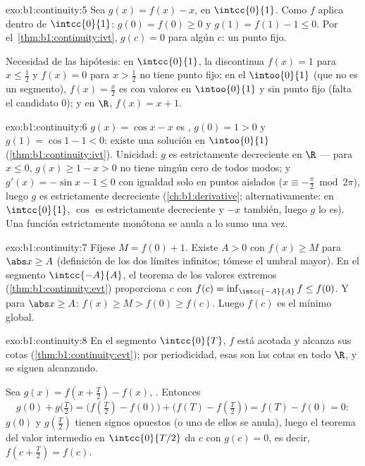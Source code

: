 \begin{solution}{exo:b1:continuity:5}
Sea $g(x) = f(x) - x$,  en $\intcc{0}{1}$. Como $f$ aplica
dentro de $\intcc{0}{1}$: $g(0) = f(0) \geq 0$ y
$g(1) = f(1) - 1 \leq 0$. Por el~\cref{thm:b1:continuity:ivt},
$g(c) = 0$ para algún $c$: un punto fijo.

Necesidad de las hipótesis: en $\intcc{0}{1}$, la 
discontinua $f(x) = 1$ para $x \leq \frac12$ y $f(x) = 0$ para
$x > \frac12$ no tiene punto fijo; en el  $\intoo{0}{1}$ (que
no es un segmento), $f(x) = \frac x2$ es  con valores en
$\intoo{0}{1}$ y sin punto fijo (falta el candidato $0$); y en $\R$,
$f(x) = x + 1$.
\end{solution}

\begin{solution}{exo:b1:continuity:6}
$g(x) = \cos x - x$ es , $g(0) = 1 > 0$ y
$g(1) = \cos 1 - 1 < 0$: existe una solución en $\intoo{0}{1}$
(\cref{thm:b1:continuity:ivt}). Unicidad: $g$ es estrictamente
decreciente en $\R$ --- para $x \leq 0$, $g(x) \geq 1 - x > 0$ no
tiene ningún cero de todos modos; y $g'(x) = -\sin x - 1 \leq 0$ con
igualdad solo en puntos aislados ($x \equiv -\frac\pi2 \bmod 2\pi$),
luego $g$ es estrictamente decreciente (\cref{ch:b1:derivative};
alternativamente: en $\intcc{0}{1}$, $\cos$ es estrictamente
decreciente y $-x$ también, luego $g$ lo es). Una función
estrictamente monótona se anula a lo sumo una vez.
\end{solution}

\begin{solution}{exo:b1:continuity:7}
Fíjese $M = f(0) + 1$. Existe $A > 0$ con $f(x) \geq M$ para
$\abs x \geq A$ (definición de los dos límites infinitos; tómese el
umbral mayor). En el segmento $\intcc{-A}{A}$, el teorema de los
valores extremos (\cref{thm:b1:continuity:evt}) proporciona $c$ con
$f(c) = \inf_{\intcc{-A}{A}} f \leq f(0)$. Y para $\abs x \geq A$:
$f(x) \geq M > f(0) \geq f(c)$. Luego $f(c)$ es el mínimo global.
\end{solution}

\begin{solution}{exo:b1:continuity:8}
En el segmento $\intcc{0}{T}$, $f$ está acotada y alcanza sus cotas
(\cref{thm:b1:continuity:evt}); por periodicidad, esas son las cotas
en todo $\R$, y se siguen alcanzando.

Sea $g(x) = f(x + \frac T2) - f(x)$, . Entonces
\[
g(0) + g\bigl(\tfrac T2\bigr)
= \bigl(f(\tfrac T2) - f(0)\bigr) + \bigl(f(T) - f(\tfrac T2)\bigr)
= f(T) - f(0) = 0 :
\]
$g(0)$ y $g(\frac T2)$ tienen signos opuestos (o uno de ellos se
anula), luego el teorema del valor intermedio en $\intcc{0}{T/2}$ da
$c$ con $g(c) = 0$, es decir, $f(c + \frac T2) = f(c)$.
\end{solution}

